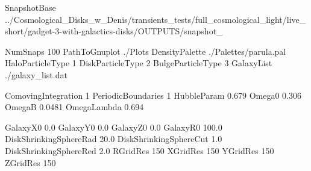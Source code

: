 %
%




SnapshotBase       ../Cosmological_Disks_w_Denis/transients_tests/full_cosmological_light/live_short/gadget-3-with-galactics-disks/OUTPUTS/snapshot_

NumSnaps           100
PathToGnuplot      ./Plots
DensityPalette     ./Palettes/parula.pal
HaloParticleType   1
DiskParticleType   2
BulgeParticleType  3
GalaxyList         ./galaxy_list.dat


ComovingIntegration    1
PeriodicBoundaries     1
HubbleParam            0.679
Omega0                 0.306
OmegaB                 0.0481
OmegaLambda            0.694


GalaxyX0                0.0
GalaxyY0                0.0
GalaxyZ0                0.0
GalaxyR0                100.0
DiskShrinkingSphereRad  20.0
DiskShrinkingSphereCut  1.0
DiskShrinkingSphereRed  2.0
RGridRes                150
XGridRes                150
YGridRes                150
ZGridRes                150
